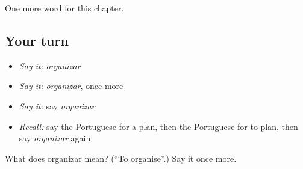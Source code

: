 \begin{grammarlens}[title={What you've built}]
One more word for this chapter.
\end{grammarlens}

\subsection*{Your turn}
\begin{itemize}
\raggedright
  \item \emph{Say it:} \emph{organizar}
  \item \emph{Say it:} \emph{organizar}, once more
  \item \emph{Say it:} say \emph{organizar}
  \item \emph{Recall:} say the Portuguese for a plan, then the Portuguese for to plan, then say \emph{organizar} again
\end{itemize}

\begin{tcolorbox}[breakable,colback=teal!4,colframe=teal!35!black,title={Before you move on}]
What does organizar mean? (\textquotedblleft{}To organise\textquotedblright{}.) Say it once more.
\end{tcolorbox}
